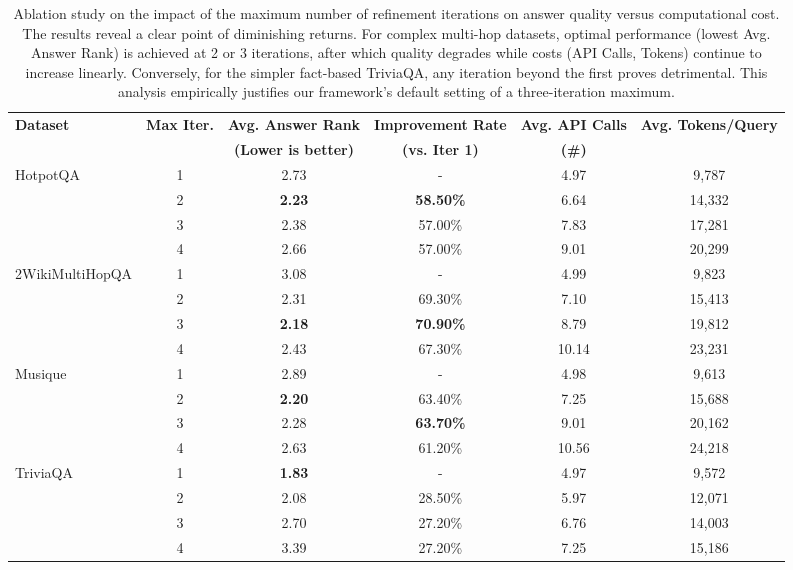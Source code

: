 \documentclass[11pt]{article}
\begin{document}
\begin{table}[t]
\centering
\small
\setlength{\tabcolsep}{4pt}
\begin{tabular}{lccccc}
\hline
\textbf{Dataset} & \textbf{Max Iter.} & \textbf{Avg. Answer Rank} & \textbf{Improvement Rate} & \textbf{Avg. API Calls} & \textbf{Avg. Tokens/Query} \\
& & \textbf{(Lower is better)} & \textbf{(vs. Iter 1)} & \textbf{(\#)} & \\
\hline
\multirow{4}{*}{HotpotQA} 
& 1 & 2.73 & - & 4.97 & 9,787 \\
& 2 & \textbf{2.23} & \textbf{58.50\%} & 6.64 & 14,332 \\
& 3 & 2.38 & 57.00\% & 7.83 & 17,281 \\
& 4 & 2.66 & 57.00\% & 9.01 & 20,299 \\
\hline
\multirow{4}{*}{2WikiMultiHopQA} 
& 1 & 3.08 & - & 4.99 & 9,823 \\
& 2 & 2.31 & 69.30\% & 7.10 & 15,413 \\
& 3 & \textbf{2.18} & \textbf{70.90\%} & 8.79 & 19,812 \\
& 4 & 2.43 & 67.30\% & 10.14 & 23,231 \\
\hline
\multirow{4}{*}{Musique} 
& 1 & 2.89 & - & 4.98 & 9,613 \\
& 2 & \textbf{2.20} & 63.40\% & 7.25 & 15,688 \\
& 3 & 2.28 & \textbf{63.70\%} & 9.01 & 20,162 \\
& 4 & 2.63 & 61.20\% & 10.56 & 24,218 \\
\hline
\multirow{4}{*}{TriviaQA} 
& 1 & \textbf{1.83} & - & 4.97 & 9,572 \\
& 2 & 2.08 & 28.50\% & 5.97 & 12,071 \\
& 3 & 2.70 & 27.20\% & 6.76 & 14,003 \\
& 4 & 3.39 & 27.20\% & 7.25 & 15,186 \\
\hline
\end{tabular}
\caption{Ablation study on the impact of the maximum number of refinement iterations on answer quality versus computational cost. The results reveal a clear point of diminishing returns. For complex multi-hop datasets, optimal performance (lowest Avg. Answer Rank) is achieved at 2 or 3 iterations, after which quality degrades while costs (API Calls, Tokens) continue to increase linearly. Conversely, for the simpler fact-based TriviaQA, any iteration beyond the first proves detrimental. This analysis empirically justifies our framework's default setting of a three-iteration maximum.}
\label{tab:iteration-impact}
\end{table}
\end{document}

